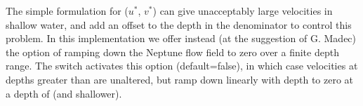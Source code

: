 \documentclass[NEMO_book]{subfiles}
\begin{document}
The simple formulation for ($u^*$, $v^*$) can give unacceptably large velocities
in shallow water, and \citep{HollowayOM08} add an offset to the depth in the
denominator to control this problem. In this implementation we offer instead (at
the suggestion of G. Madec) the option of ramping down the Neptune flow field to
zero over a finite depth range. The switch  activates this
option (default=false), in which case velocities at depths greater than
 are unaltered, but ramp down linearly with depth to zero at a
depth of  (and shallower).

\end{document}

